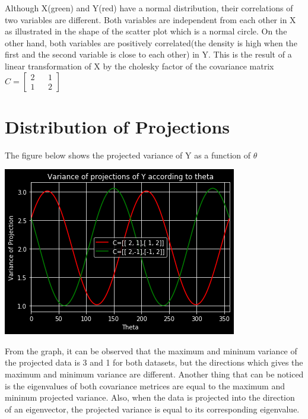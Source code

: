 \documentclass{article}
\begin{document}
Although X(green) and Y(red) have a normal distribution, their correlations of two variables are different. Both variables are independent from each other in X as illustrated in the shape of the scatter plot which is a normal circle. On the other hand, both variables are positively correlated(the density is high when the first and the second variable is close to each other) in Y. This is the result of a linear transformation of X by the cholesky factor of the covariance matrix $C = \begin{bmatrix}2 && 1\\1 && 2\end{bmatrix}$
\pagebreak

\maketitle
\section{Distribution of Projections}
The figure below shows the projected variance of Y as a function of $\theta$
\begin{center}
\includegraphics[scale=0.4]{variance_of_proj}
\end{center}
From the graph, it can be observed that the maximum and mininum variance of the projected data is 3 and 1 for both datasets, but the directions which gives the maximum and minimum variance are different.
Another thing that can be noticed is the eigenvalues of both covariance metrices are equal to the maximum and mininum projected variance. Also, when the data is projected into the direction of an eigenvector, the projected variance is equal to its corresponding eigenvalue. 
\end{document}
